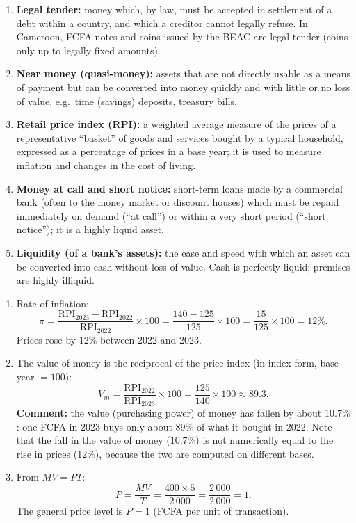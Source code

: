 \documentclass[11pt]{article}
\newcommand{\cle}[1]{{\popxbold\color{popdark}#1}}
\begin{document}
\begin{corrige}
\begin{enumerate}
\item \textbf{\cle{Legal tender}:} money which, by law, must be accepted in settlement of a debt within a country, and which a creditor cannot legally refuse. In Cameroon, FCFA notes and coins issued by the BEAC are legal tender (coins only up to legally fixed amounts).
\item \textbf{\cle{Near money} (quasi-money):} assets that are not directly usable as a means of payment but can be converted into money quickly and with little or no loss of value, e.g.\ time (savings) deposits, treasury bills.
\item \textbf{\cle{Retail price index (RPI)}:} a weighted average measure of the prices of a representative ``basket'' of goods and services bought by a typical household, expressed as a percentage of prices in a base year; it is used to measure \cle{inflation} and changes in the cost of living.
\item \textbf{\cle{Money at call and short notice}:} short-term loans made by a commercial bank (often to the money market or discount houses) which must be repaid immediately on demand (``at call'') or within a very short period (``short notice''); it is a highly liquid asset.
\item \textbf{\cle{Liquidity} (of a bank's assets):} the ease and speed with which an asset can be converted into cash without loss of value. Cash is perfectly liquid; premises are highly illiquid.
\end{enumerate}
\end{corrige}

\begin{corrige}
\begin{enumerate}
\item Rate of \cle{inflation}:
\[ \pi = \frac{\text{RPI}_{2023} - \text{RPI}_{2022}}{\text{RPI}_{2022}} \times 100 = \frac{140 - 125}{125} \times 100 = \frac{15}{125} \times 100 = 12\%. \]
Prices rose by $12\%$ between 2022 and 2023.
\item The \cle{value of money} is the reciprocal of the price index (in index form, base year $= 100$):
\[ V_m = \frac{\text{RPI}_{2022}}{\text{RPI}_{2023}} \times 100 = \frac{125}{140} \times 100 \approx 89.3. \]
\textbf{Comment:} the value (purchasing power) of money has fallen by about $10.7\%$: one FCFA in 2023 buys only about $89\%$ of what it bought in 2022. Note that the fall in the value of money ($10.7\%$) is not numerically equal to the rise in prices ($12\%$), because the two are computed on different bases.
\item From $MV = PT$:
\[ P = \frac{MV}{T} = \frac{400 \times 5}{2\,000} = \frac{2\,000}{2\,000} = 1. \]
The general price level is $P = 1$ (FCFA per unit of transaction).
\end{enumerate}
\end{corrige}
\end{document}
